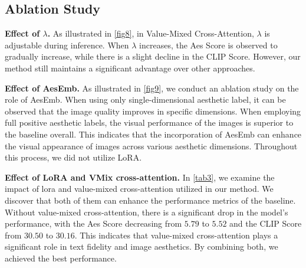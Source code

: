 \subsection{Ablation Study}
\noindent \textbf{Effect of $\lambda$.} As illustrated in \cref{fig8}, in Value-Mixed Cross-Attention, $\lambda$ is adjustable during inference. When $\lambda$ increases, the Aes Score is observed to gradually increase, while there is a slight decline in the CLIP
Score. However, our method still maintains a significant advantage over other approaches.

\noindent \textbf{Effect of AesEmb.} As illustrated in \cref{fig9}, we conduct an ablation study on the role of AesEmb. When using only single-dimensional aesthetic label, it can be observed that the image quality improves in specific dimensions. When employing full positive aesthetic labels, the visual performance of the images is superior to the baseline overall. This indicates that the incorporation of AesEmb can enhance the visual appearance of images across various aesthetic dimensions. Throughout this process, we did not utilize LoRA.

\noindent \textbf{Effect of LoRA and VMix cross-attention.} In \cref{tab3}, we examine the impact of lora and value-mixed cross-attention utilized in our method. We discover that both of them can enhance the performance metrics of the baseline. Without value-mixed cross-attention, there is a significant drop in the model's performance, with the Aes Score decreasing from $5.79$ to $5.52$ and the CLIP Score from $30.50$ to $30.16$. This indicates that value-mixed cross-attention plays a significant role in text fidelity and image aesthetics. By combining both, we achieved the best performance.
